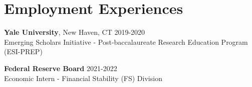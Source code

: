 
\section{Employment Experiences}
\vspace{-0.25in}
\begin{outerlist}
	\item \textbf{Yale University}, New Haven, CT \hfill 2019-2020 \\
	Emerging Scholars Initiative - Post-baccalaureate Research Education Program (ESI-PREP)
	\item \textbf{Federal Reserve Board} \hfill 2021-2022 \\
	Economic Intern - Financial Stability (FS) Division
\end{outerlist}
